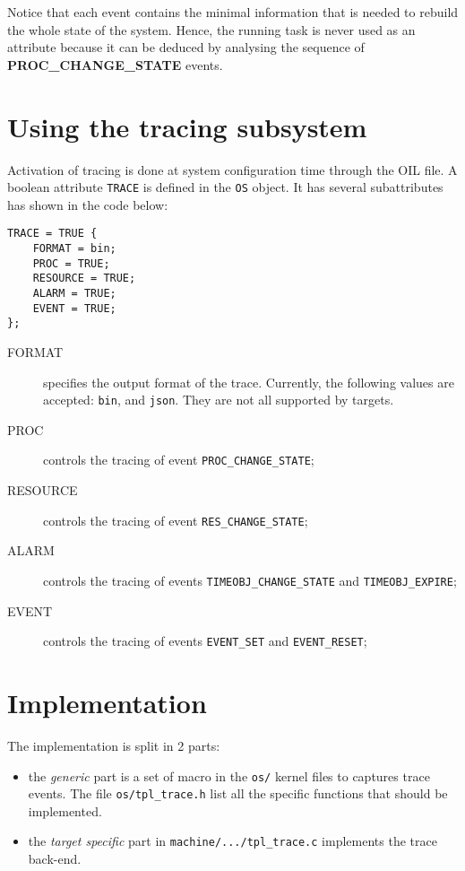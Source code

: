 Notice that each event contains the minimal information that is needed
to rebuild the whole state of the system.
Hence, the running task is never used as an attribute because it can be deduced
by analysing the sequence of \textbf{PROC\_CHANGE\_STATE} events.

\section{Using the tracing subsystem}

Activation of tracing is done at system configuration time through the OIL file.
A boolean attribute \texttt{TRACE} is defined in the \texttt{OS} object. It has
several subattributes has shown in the code below:

\begin{lstlisting}[language=OIL]
TRACE = TRUE {
    FORMAT = bin;
    PROC = TRUE;
    RESOURCE = TRUE;
    ALARM = TRUE;
    EVENT = TRUE;
};
\end{lstlisting}

\begin{description}
  \item[FORMAT] specifies the output format of the trace. Currently, the
    following values are accepted: \texttt{bin}, and
    \texttt{json}. They are not all supported by targets.

  \item[PROC] controls the tracing of event \texttt{PROC\_CHANGE\_STATE};

  \item[RESOURCE] controls the tracing of event \texttt{RES\_CHANGE\_STATE};

  \item[ALARM] controls the tracing of events \texttt{TIMEOBJ\_CHANGE\_STATE}
    and \texttt{TIMEOBJ\_EXPIRE};

  \item[EVENT]  controls the tracing of events \texttt{EVENT\_SET}
    and \texttt{EVENT\_RESET};
\end{description}

\section{Implementation}
The implementation is split in 2 parts:
\begin{itemize}
	\item the \emph{generic} part is a set of macro in the \texttt{os/} kernel files to captures trace events. The file \texttt{os/tpl_trace.h} list all the specific functions that should be implemented.
	\item the \emph{target specific} part in \lstinline{machine/.../tpl_trace.c} implements the trace back-end. 
\end{itemize}

